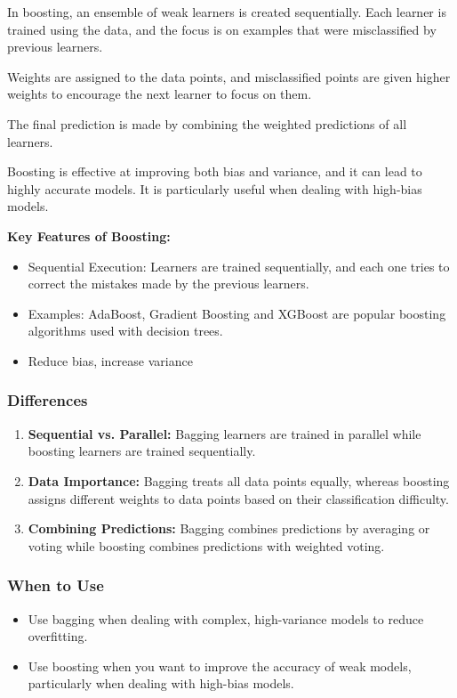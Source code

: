 \documentclass[letterpaper,12pt]{article}
\begin{document}
In boosting, an ensemble of weak learners is created sequentially. Each learner is trained using the data, and the focus is on examples that were misclassified by previous learners.

Weights are assigned to the data points, and misclassified points are given higher weights to encourage the next learner to focus on them.

The final prediction is made by combining the weighted predictions of all learners.

Boosting is effective at improving both bias and variance, and it can lead to highly accurate models. It is particularly useful when dealing with high-bias models.

\textbf{Key Features of Boosting:}
\begin{itemize}
    \item Sequential Execution: Learners are trained sequentially, and each one tries to correct the mistakes made by the previous learners.
    \item Examples: AdaBoost, Gradient Boosting and XGBoost are popular boosting algorithms used with decision trees.
    \item Reduce bias, increase variance
\end{itemize}

\subsubsection{Differences}

\begin{enumerate}
    \item \textbf{Sequential vs. Parallel:} Bagging learners are trained in parallel while boosting learners are trained sequentially.
    \item \textbf{Data Importance:} Bagging treats all data points equally, whereas boosting assigns different weights to data points based on their classification difficulty.
    \item \textbf{Combining Predictions:} Bagging combines predictions by averaging or voting while boosting combines predictions with weighted voting.
\end{enumerate}

\subsubsection{When to Use}

\begin{itemize}
    \item Use bagging when dealing with complex, high-variance models to reduce overfitting.
    \item Use boosting when you want to improve the accuracy of weak models, particularly when dealing with high-bias models.
\end{itemize}
\end{document}
